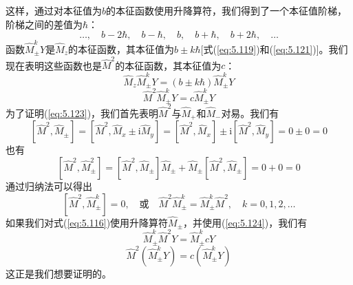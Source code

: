     这样，通过对本征值为$b$的本征函数使用升降算符，我们得到了一个本征值阶梯，阶梯之间的差值为$\hbar$：
    \begin{equation*}
        \ldots, \quad b-2\hbar, \quad b-\hbar, \quad b, \quad b+\hbar, \quad b+2\hbar, \quad \ldots
    \end{equation*}
    函数$\hat{M}_{\pm}^kY$是$\hat{M}_z$的本征函数，其本征值为$b \pm k\hbar$[式(\ref{eq:5.119})和(\ref{eq:5.121})]。我们现在表明这些函数也是$\hat{M}^2$的本征函数，其本征值为$c$：
    \begin{equation}
        \hat{M}_z\hat{M}_{\pm}^kY = \left(b \pm k\hbar\right)\hat{M}_{\pm}^kY
        \label{eq:5.122}
    \end{equation}
    \begin{equation}
        \hat{M}^2\hat{M}_{\pm}^kY = c\hat{M}_{\pm}^kY
        \label{eq:5.123}
    \end{equation}
    为了证明(\ref{eq:5.123})，我们首先表明$\hat{M}^2$与$\hat{M}_+$和$\hat{M}_-$对易。我们有
    \begin{equation*}
        \left[\hat{M}^2,\hat{M}_{\pm}\right] = \left[\hat{M}^2,\hat{M}_x\pm\mathrm{i}\hat{M}_y\right] = \left[\hat{M}^2,\hat{M}_x\right] \pm \mathrm{i}\left[\hat{M}^2,\hat{M}_y\right] = 0 \pm 0 = 0
    \end{equation*}
    也有
    \begin{equation*}
        \left[\hat{M}^2,\hat{M}_{\pm}^2\right] = \left[\hat{M}^2,\hat{M}_{\pm}\right]\hat{M}_{\pm} + \hat{M}_{\pm}\left[\hat{M}^2,\hat{M}_{\pm}\right] = 0 + 0 = 0
    \end{equation*}
    通过归纳法可以得出
    \begin{equation}
        \left[\hat{M}^2,\hat{M}_{\pm}^k\right] = 0, \quad \text{或} \quad \hat{M}^2\hat{M}_{\pm}^k = \hat{M}_{\pm}^k\hat{M}^2, \quad k = 0, 1, 2, \ldots
        \label{eq:5.124}
    \end{equation}
    如果我们对式(\ref{eq:5.116})使用升降算符$\hat{M}_{\pm}$，并使用(\ref{eq:5.124})，我们有
    \begin{equation*}
        \hat{M}_{\pm}^k\hat{M}^2Y = \hat{M}_{\pm}^k cY
    \end{equation*}
    \begin{equation}
        \hat{M}^2\left(\hat{M}_{\pm}^kY\right) = c\left(\hat{M}_{\pm}^kY\right)
        \label{eq:5.125}
    \end{equation}
    这正是我们想要证明的。

